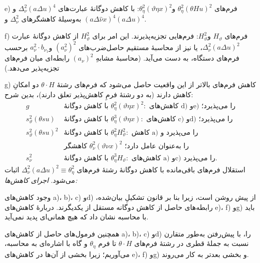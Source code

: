 \documentclass[11pt]{article}
\providecommand{\A}{\Delta}
\begin{document}
e) فرم‌های $\theta_\eta^2(\theta Hu)^2$ و$\theta_\eta^2(\vartheta\eta x)^2$: با کاهش دوگانهٔ عبارت‌های $\A_\nu^2(a\A u)^4$ و$(a\A\widehat{\nu}x)^4$ به‌وسیلهٔ کاهشگرهای $\A_\nu^2$ و$(a\A u)^4$.

f) فرم‌های $H_\vartheta$ و$H_\vartheta^2$: فرم‌هایی تجزیه‌پذیرند. این امر برای $H_\vartheta^2$ از کاهش دوگانهٔ عبارت $\A_\nu^2(a\A u)^2$، یا نیز از محاسبهٔ مستقیم حاصل‌ضرب‌های $(a_\nu^2)^2$ و$a_\nu^2\cdot b_{\nu_1}$ برحسب فرم‌های دستگاه، به دست می‌آید. (محاسبهٔ مشابهِ $(a_\nu)^2$ رابطه‌ای میان فرم‌های تجزیه‌پذیر می‌دهد.)

g) کاهش فرم‌های بالاتر از این واقعیت حاصل می‌شود که فرم‌های رشتهٔ $\theta\cdot H$ دو امکانِ کاهش دارند (به دو رشتهٔ فرمِ کاهش‌پذیر تعلق دارند)، بدین شرح:
\[
\begin{array}{rl}
g&\text{با کاهش دوگانهٔ }\theta_\eta^2(\vartheta\eta x)^2:\text{ کاهش‌های d) وe) را می‌پذیرد؛}\\[0.3em]
s_\vartheta^2(\theta s u)&\text{با کاهش دوگانهٔ }\theta_\eta^3(\vartheta\eta x):\text{ کاهش‌های c) وd) را می‌پذیرد؛}\\[0.3em]
s_\vartheta^2(\theta s u)^2&\text{با کاهش دوگانهٔ }\theta_\eta^2H_\vartheta^2:\text{ کاهش a) را می‌پذیرد و}\\
&\text{کاهشگر }\theta_\nu^2(\vartheta\nu x)^2\text{ را به‌عنوان عامل دارد؛}\\[0.3em]
s_\nu^2&\text{با کاهش دوگانهٔ }\theta_\eta^3H_\vartheta:\text{ کاهش‌های a) وc) را می‌پذیرد.}
\end{array}
\]
استقلال فرم‌های باقی‌مانده با کاهش دوگانهٔ رشتهٔ فرم‌های $\A_\nu^2(a\A u)^2\equiv\theta_\eta^2$ اثبات می‌شود.
\noindent\emph{اجرای کاهش‌ها:}

وجود کاهش‌های a)، b)، c) وd) از پیش روشن است، زیرا بنا بر قانون تشکیلِ بیان‌شده، رابطه‌های حاصل از کاهش دوگانه مستقل از یکدیگرند. دربارهٔ کاهش‌های e)، f) وg) باید با محاسبه نشان داد که هیچ همانی‌ای پدید نمی‌آید.

همچنین فرمول‌های حاصل از کاهش‌های a)، b)، c) وd) را، با پیش‌رفتن به‌طور متقارن نسبت به جملهٔ قطری در رشتهٔ فرم‌های $\theta\cdot H$ تا فرم $\theta_\eta$ و گاه با اشاره‌ای به محاسبه، می‌آوریم؛ زیرا بخشی از آن‌ها در کاهش‌های e)، f) وg) و بخشی بعدتر به کار می‌روند.
\end{document}
